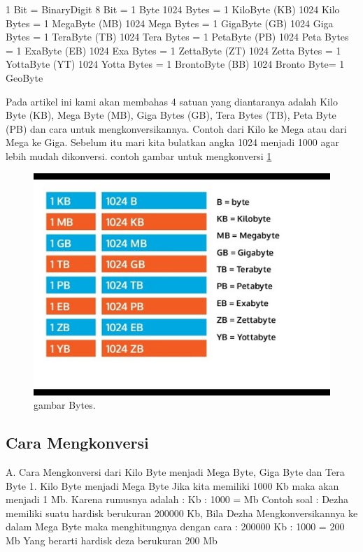 1 Bit = BinaryDigit
8 Bit = 1 Byte
1024 Bytes = 1 KiloByte (KB)
1024 Kilo Bytes = 1 MegaByte (MB)
1024 Mega Bytes = 1 GigaByte (GB)
1024 Giga Bytes = 1 TeraByte (TB)
1024 Tera Bytes = 1 PetaByte (PB)
1024 Peta Bytes = 1 ExaByte (EB)
1024 Exa Bytes = 1 ZettaByte (ZT)
1024 Zetta Bytes = 1 YottaByte (YT)
1024 Yotta Bytes = 1 BrontoByte (BB)
1024 Bronto Byte= 1 GeoByte

Pada artikel ini kami akan membahas 4 satuan yang diantaranya adalah Kilo Byte (KB), Mega Byte (MB), Giga Bytes (GB), Tera Bytes (TB), Peta Byte (PB) dan cara untuk mengkonversikannya. Contoh dari Kilo ke Mega atau dari Mega ke Giga. 
Sebelum itu mari kita bulatkan angka 1024 menjadi 1000 agar lebih mudah dikonversi. \cite{menon1999nanotechnology}
contoh gambar untuk mengkonversi 
\ref{Bytes.JPG}
\begin{figure}[ht]
\centerline{\includegraphics[width=1\textwidth]{figures/Bytes.JPG}}
\caption{gambar Bytes.}
\label{Bytes.JPG}
\end{figure}

\subsection {Cara Mengkonversi}
A.	Cara Mengkonversi dari Kilo Byte menjadi Mega Byte, Giga Byte dan Tera Byte
1.	Kilo Byte menjadi Mega Byte
Jika kita memiliki 1000 Kb maka akan menjadi 1 Mb. Karena rumusnya adalah :
Kb : 1000 = Mb
Contoh soal :
Dezha memiliki suatu hardisk berukuran 200000 Kb, Bila Dezha Mengkonversikannya ke dalam Mega Byte maka menghitungnya dengan cara :
200000 Kb : 1000 = 200 Mb
Yang berarti hardisk deza berukuran 200 Mb

